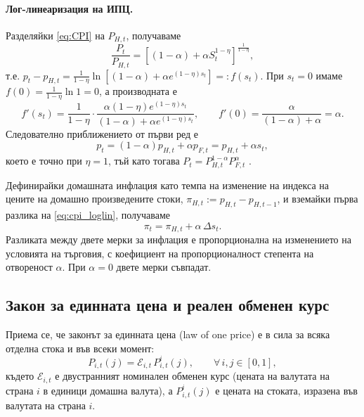 \paragraph{Лог-линеаризация на ИПЦ.}
Разделяйки \eqref{eq:CPI} на $P_{H,t}$, получаваме
\begin{equation}
\frac{P_t}{P_{H,t}} = \left[ (1-\alpha) + \alpha S_t^{1-\eta} \right]^{\frac{1}{1-\eta}},
\label{eq:cpi_ratio}
\end{equation}
т.е. $p_t - p_{H,t} = \frac{1}{1-\eta} \ln\!\left[ (1-\alpha) + \alpha e^{(1-\eta)s_t} \right] =: f(s_t)$. При $s_t = 0$ имаме $f(0) = \frac{1}{1-\eta}\ln 1 = 0$, а производната е
\[
f'(s_t) = \frac{1}{1-\eta} \cdot \frac{\alpha(1-\eta)e^{(1-\eta)s_t}}{(1-\alpha) + \alpha e^{(1-\eta)s_t}},
\qquad
f'(0) = \frac{\alpha}{(1-\alpha)+\alpha} = \alpha.
\]
Следователно приближението от първи ред е
\begin{equation}
p_t = (1-\alpha) p_{H,t} + \alpha p_{F,t} = p_{H,t} + \alpha s_t,
\label{eq:cpi_loglin}
\end{equation}
което е точно при $\eta = 1$, тъй като тогава $P_t = P_{H,t}^{1-\alpha} P_{F,t}^{\alpha}$ \parencite[с.~155]{Gali2008}.

Дефинирайки домашната инфлация като темпа на изменение на индекса на цените на домашно произведените стоки, $\pi_{H,t} := p_{H,t} - p_{H,t-1}$, и вземайки първа разлика на \eqref{eq:cpi_loglin}, получаваме
\begin{equation}
\pi_t = \pi_{H,t} + \alpha\, \Delta s_t.
\label{eq:pi_cpi_domestic}
\end{equation}
Разликата между двете мерки за инфлация е пропорционална на изменението на условията на търговия, с коефициент на пропорционалност степента на отвореност $\alpha$. При $\alpha = 0$ двете мерки съвпадат.

\subsection{Закон за единната цена и реален обменен курс}

Приема се, че законът за единната цена (law of one price) е в сила за всяка отделна стока и във всеки момент:
\begin{equation}
P_{i,t}(j) = \mathcal{E}_{i,t}\, P^i_{i,t}(j), \qquad \forall\, i, j \in [0,1],
\label{eq:lop}
\end{equation}
където $\mathcal{E}_{i,t}$ е двустранният номинален обменен курс (цената на валутата на страна $i$ в единици домашна валута), а $P^i_{i,t}(j)$ е цената на стоката, изразена във валутата на страна $i$.

